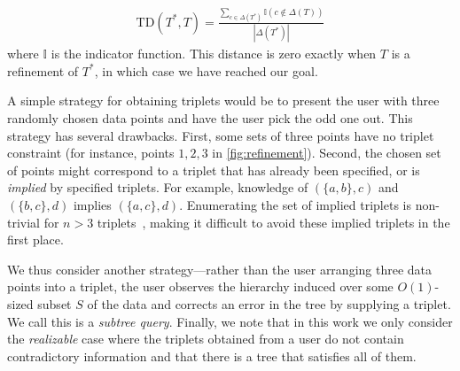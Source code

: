 \begin{align}
    \mathrm{TD}(T^*, T) = \frac{\sum_{c \in \Delta(T^*)} \mathbb{I}(c \notin \Delta(T)) }{|\Delta(T^*)|}
\end{align}
where $\mathbb{I}$ is the indicator function.
This distance is zero exactly when $T$ is a refinement of $T^*$, in which case we have reached our goal. 



A simple strategy for obtaining triplets 
would be to present the user with three randomly
chosen data points and have the user pick the odd one out.
This strategy has several drawbacks.
First, some sets of three points have no triplet constraint 
(for instance, points $1,2,3$ in \autoref{fig:refinement}).
Second, the chosen set of points might correspond to a triplet
that has already been specified, or is {\it implied} by 
specified triplets. For example, knowledge of $(\{a, b\}, c)$ and
$(\{b, c\}, d)$ implies $(\{a, c\}, d)$.
Enumerating the set of implied
triplets is non-trivial for $n > 3$ triplets~\cite{Bryant1995},
making it difficult to avoid these implied triplets
in the first place.

We thus consider another strategy---rather
than the user arranging three data points into
a triplet, the user observes
the hierarchy induced over some $O(1)$-sized
subset $S$ of the data and corrects
an error in the tree by supplying a triplet.
We call this is a \emph{subtree query}.
Finally, we note that in this work
we only consider the \emph{realizable} case
where the triplets obtained
from a user do not contain contradictory information
and that there is a tree that satisfies
all of them.

